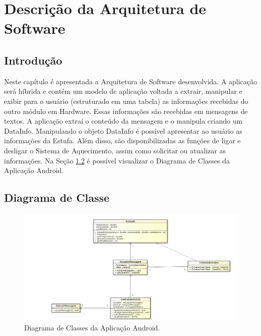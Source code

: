 \documentclass{report}
\begin{document}
\chapter{Descrição da Arquitetura de Software}
  
  \section{Introdução}
      Neste capítulo é apresentada a Arquitetura de Software desenvolvida. A aplicação será híbrida e contém um modelo de aplicação voltada a extrair, manipular e exibir para 
      o usuário (estruturado em uma tabela) as informações recebidas do outro módulo em Hardware. Essas informações são recebidas em mensagens de textos. A aplicação extraí o 
      conteúdo da mensagem e o manipula criando um DataInfo. Manipulando o objeto DataInfo é possível apresentar ao usuário as informações da Estufa. Além disso, são disponibilizadas
      as funções de ligar e desligar o Sistema de Aquecimento, assim como solicitar ou atualizar as informações. Na Seção {\ref{dmClasseSW}} é possível visualizar o Diagrama 
      de Classes da Aplicação Android. 
      
  \section{Diagrama de Classe}\label{dmClasseSW}

    \begin{landscape}
	\begin{figure}[H]
	    \begin{center}
	      \includegraphics[width=\linewidth]{pictures/diagramaClassesSw.png}
	      \caption{Diagrama de Classes da Aplicação Android.}
	  \end{center}
	\end{figure}
    \end{landscape}

% 
% 
\end{document}
